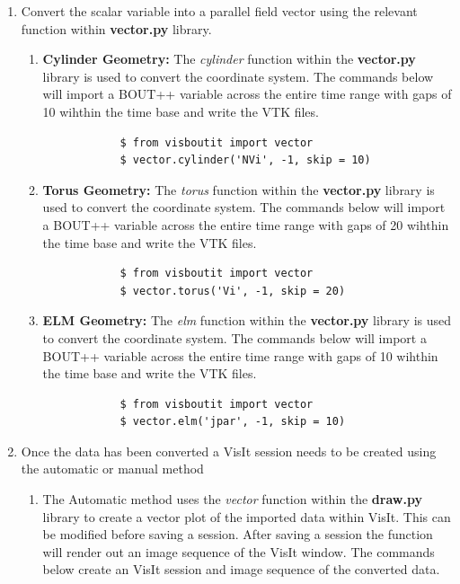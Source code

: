 \documentclass[12pt,a4paper]{article}
\begin{document}
\begin{enumerate}
	\item{Convert the scalar variable into a parallel field vector using the relevant function within \textbf{vector.py} library.}
	\begin{enumerate}
		\label{example:v_cylinder}
		\item{\textbf{Cylinder Geometry:} The \textit{cylinder} function within the \textbf{vector.py} library is used to convert the coordinate system. The commands below will import a BOUT++ variable across the entire time range with gaps of 10 wihthin the time base and write the VTK files.
			\begin{verbatim}
			$ from visboutit import vector
			$ vector.cylinder('NVi', -1, skip = 10)
			\end{verbatim}
		}
		\item{\textbf{Torus Geometry:} The \textit{torus} function within the \textbf{vector.py} library is used to convert the coordinate system. The commands below will import a BOUT++ variable across the entire time range with gaps of 20 wihthin the time base and write the VTK files.
			\begin{verbatim}
			$ from visboutit import vector
			$ vector.torus('Vi', -1, skip = 20)
			\end{verbatim}
		}
		\item{\textbf{ELM Geometry:} The \textit{elm} function within the \textbf{vector.py} library is used to convert the coordinate system. The commands below will import a BOUT++ variable across the entire time range with gaps of 10 wihthin the time base and write the VTK files.
			\begin{verbatim}
			$ from visboutit import vector
			$ vector.elm('jpar', -1, skip = 10)
			\end{verbatim}
		}
	\end{enumerate}
	\item{Once the data has been converted a VisIt session needs to be created using the automatic or manual method}
	\begin{enumerate}
		\item{The Automatic method uses the \textit{vector} function within the \textbf{draw.py} library to create a vector plot of the imported data within VisIt. This can be modified before saving a session. After saving a session the function will render out an image sequence of the VisIt window. The commands below create an VisIt session and image sequence of the converted data.
			
}
\end{enumerate}
\end{enumerate}
\end{document}
